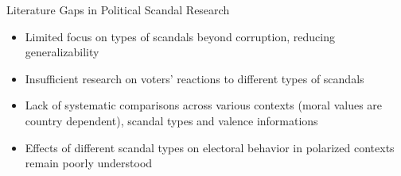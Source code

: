 \documentclass[9pt, aspectratio=169]{beamer}
\newcommand{\customcite}[1]{\textcolor{blue}{\parencite{#1}}}
\newcommand{\customcites}[1]{\textcolor{blue}{\parencites{#1}}}
\begin{document}
\begin{frame}{Literature Gaps in Political Scandal Research}
    \begin{itemize}
        \item Limited focus on types of scandals beyond corruption, reducing generalizability \customcite{kumlin2012scandal} \vspace{0.3cm}
        \item Insufficient research on voters' reactions to different types of scandals \vspace{0.3cm}
        \item Lack of systematic comparisons across various contexts (moral values are country dependent), scandal types and valence informations \customcite{kumlin2012scandal} \vspace{0.3cm}
        \item Effects of different scandal types on electoral behavior in polarized contexts remain poorly understood \customcites{puglisi2011, darr2019collision, Rottinghaus_2023} \vspace{0.3cm} 
    \end{itemize}
\end{frame}




\end{document}
